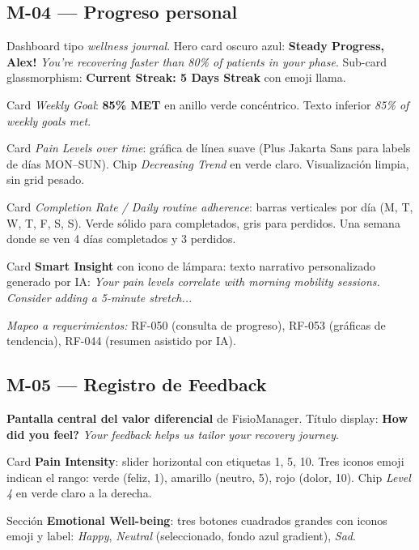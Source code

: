 \subsection{M-04 --- Progreso personal}

Dashboard tipo \textit{wellness journal}. Hero card oscuro azul: \textbf{Steady Progress, Alex!} \textit{You're recovering faster than 80\% of patients in your phase}. Sub-card glassmorphism: \textbf{Current Streak: 5 Days Streak} con emoji llama.

Card \textit{Weekly Goal}: \textbf{85\% MET} en anillo verde concéntrico. Texto inferior \textit{85\% of weekly goals met}.

Card \textit{Pain Levels over time}: gráfica de línea suave (Plus Jakarta Sans para labels de días MON--SUN). Chip \textit{Decreasing Trend} en verde claro. Visualización limpia, sin grid pesado.

Card \textit{Completion Rate / Daily routine adherence}: barras verticales por día (M, T, W, T, F, S, S). Verde sólido para completados, gris para perdidos. Una semana donde se ven 4 días completados y 3 perdidos.

Card \textbf{Smart Insight} con icono de lámpara: texto narrativo personalizado generado por IA: \textit{Your pain levels correlate with morning mobility sessions. Consider adding a 5-minute stretch...}

\textit{Mapeo a requerimientos:} RF-050 (consulta de progreso), RF-053 (gráficas de tendencia), RF-044 (resumen asistido por IA).


\subsection{M-05 --- Registro de Feedback}

\textbf{Pantalla central del valor diferencial} de FisioManager. Título display: \textbf{How did you feel?} \textit{Your feedback helps us tailor your recovery journey}.

Card \textbf{Pain Intensity}: slider horizontal con etiquetas 1, 5, 10. Tres iconos emoji indican el rango: verde (feliz, 1), amarillo (neutro, 5), rojo (dolor, 10). Chip \textit{Level 4} en verde claro a la derecha.

Sección \textbf{Emotional Well-being}: tres botones cuadrados grandes con iconos emoji y label: \textit{Happy}, \textit{Neutral} (seleccionado, fondo azul gradient), \textit{Sad}.

